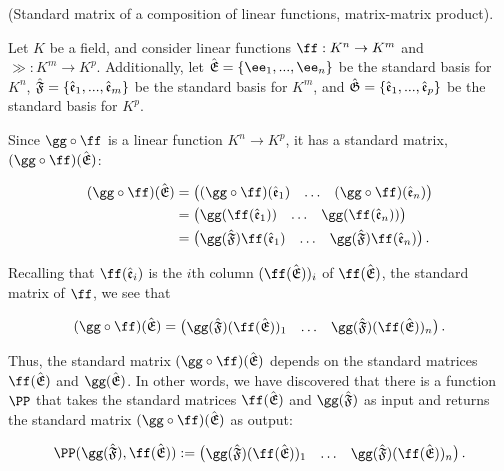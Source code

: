 \begin{deriv}
\label{ch::lin_alg::deriv::matrix_matrix_product_relative_to_bases_standard}
    (Standard matrix of a composition of linear functions, matrix-matrix product). 
    
    Let $K$ be a field, and consider linear functions $\ff:K^n \rightarrow K^m$ and $\gg:K^m \rightarrow K^p$. Additionally, let $\sE = \{\ee_1, ..., \ee_n\}$ be the standard basis for $K^n$, ${\hat{\mathfrak{F}}} = \{\hat{\mathfrak{e}}_1, ..., \hat{\mathfrak{e}}_m\}$ be the standard basis for $K^m$, and ${\hat{\mathfrak{G}}} = \{\hat{\mathfrak{e}}_1, ..., \hat{\mathfrak{e}}_p\}$ be the standard basis for $K^p$.
    
    Since $\gg \circ \ff$ is a linear function $K^n \rightarrow K^p$, it has a standard matrix, $(\gg \circ \ff)(\sE)$:
    
    \begin{align*}
        (\gg \circ \ff)(\sE)
        &=
        \begin{pmatrix}
            (\gg \circ \ff)(\see_1) & \hdots & (\gg \circ \ff)(\see_n)
        \end{pmatrix} \\
        &=
        \begin{pmatrix}
            \gg(\ff(\see_1)) & \hdots & \gg(\ff(\see_n))
        \end{pmatrix} \\
        &=
        \begin{pmatrix}
            \gg(\sF) \ff(\see_1) & \hdots & \gg(\sF) \ff(\see_n)
        \end{pmatrix}.
    \end{align*}
    
    Recalling that $\ff(\see_i)$ is the $i$th column $(\ff(\sE))_i$ of $\ff(\sE)$, the standard matrix of $\ff$, we see that
    
    \begin{align*}
        (\gg \circ \ff)(\sE) = 
        \begin{pmatrix} 
            \gg(\sF) (\ff(\sE))_1 & \hdots & \gg(\sF) (\ff(\sE))_n
        \end{pmatrix}.
    \end{align*}
    
    Thus, the standard matrix $(\gg \circ \ff)(\sE)$ depends on the standard matrices $\ff(\sE)$ and $\gg(\sE)$. In other words, we have discovered that there is a function $\PP$ that takes the standard matrices $\ff(\sE)$ and $\gg(\sF)$ as input and returns the standard matrix $(\gg \circ \ff)(\sE)$ as output:
    
    \begin{align*}
        \PP(\gg(\sF), \ff(\sE)) := \begin{pmatrix} 
            \gg(\sF) (\ff(\sE))_1 & \hdots & \gg(\sF) (\ff(\sE))_n
        \end{pmatrix}.
    \end{align*}
    

\end{deriv}
